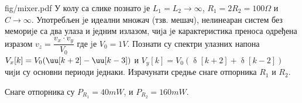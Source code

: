 \begin{slikaDesno}{fig/mixer.pdf}
    \PID 
    У колу са слике познато jе $L_1 = L_2 \to \infty$, 
    $R_1 = 2 R_2 = 100\unit{\Omega}$ и 
    $C \to \infty$. 
    Употребљен jе идеални множач (тзв. мешач), нелинеаран систем без мемориjе са два улаза и једним излазом,
    чиjа jе карактеристика преноса одређена изразом 
    $v_z = \dfrac{v_x \cdot v_y}{V_0}$
    где jе $V_0 = 1\unit{V}$. 
    Познати су спектри улазних напона 
    $V_x[k] = V_0 (\uu[k + 2] - \uu[k - 3])$ и
    $V_y[k] = V_0 (\updelta[k + 2] + \updelta[k - 2])$ чиjи су основни
    периоди једнаки. Израчунати средње снаге отпорника $R_1$ и $R_2$.
\end{slikaDesno}

\REZULTAT Снаге отпорника су 
$P_{R_1} = 40\unit{mW}$, и 
$P_{R_2} = 160\unit{mW}$.
